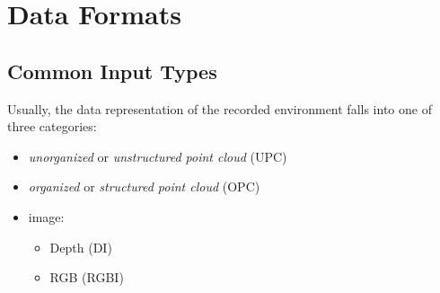\documentclass[main.tex]{subfiles}
\begin{document}
\section{Data Formats}
\label{sec:dataformats}
\subsection{Common Input Types}
Usually, the data representation of the recorded environment falls into one of three categories:
\begin{itemize}
    \item \textit{unorganized} or \textit{unstructured point cloud} (UPC)
    \item \textit{organized} or \textit{structured point cloud} (OPC)
    \item image:
          \begin{itemize}
              \item Depth (DI)
              \item RGB (RGBI)
          \end{itemize}
\end{itemize}
\end{document}
